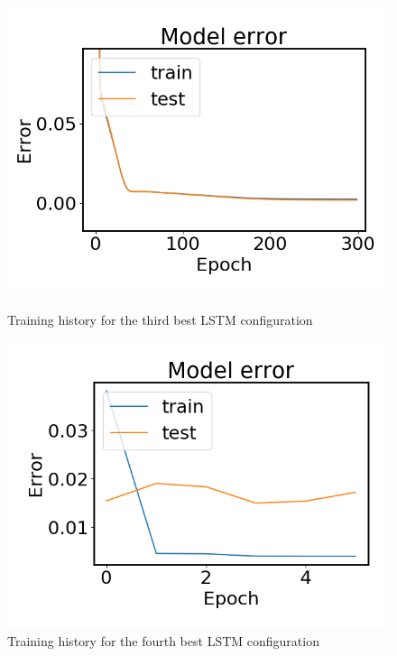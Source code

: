     \begin{figure}
        \begin{minipage}[b]{0.49\linewidth}
            \centering
            \includegraphics[width = \textwidth]{report/figures/analysis/lstm_gridsearch/best_lstm_error_3_zoomed.png}
            \caption{Training history for the third best LSTM configuration}
            \label{fig:lstm_grid_error_best_appendix}
        \end{minipage}
        \hfill\vline\hfill
        \begin{minipage}[b]{0.49\linewidth}
            \centering
            \includegraphics[width = \textwidth]{report/figures/analysis/lstm_gridsearch/worst_lstm_error_-3.png}
            \caption{Training history for the fourth best LSTM configuration}
            \label{fig:lstm_grid_error_worst_appendix}
        \end{minipage}
    \end{figure}


